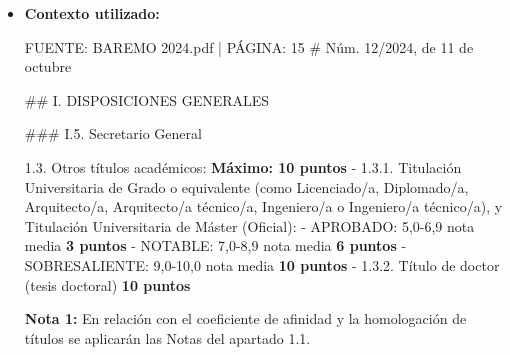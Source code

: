\documentclass{article}
\begin{document}
\begin{itemize}
\begin{itemize}
                - \textbf{1 punto / 10 horas} = \textbf{0,1 puntos por hora}.

                Sin embargo, es importante tener en cuenta que este cálculo se basa en la interpretación de la información proporcionada y podría requerir ajustes según la normativa específica o contextos adicionales no mencionados en el texto proporcionado.

                \#\#\# Complementos a la Puntuación

                Además, existen complementos que pueden multiplicar la puntuación obtenida por la experiencia docente, como:

                - \textbf{Complemento 1 (multiplicativo):} Docencia en Máster Universitario (oficial) puede multiplicar la puntuación por 1,50.
                - \textbf{Complemento 2 (multiplicando al complemento 1):} Docencia en inglés u otras lenguas diferentes a las que son objeto de estudio puede multiplicar la puntuación por 1,50.

                Estos complementos pueden aumentar significativamente la puntuación final por la experiencia docente, dependiendo de las características específicas de la docencia impartida.
          \item \textbf{Contexto utilizado:}
                \begin{scriptsize}
                  FUENTE: BAREMO 2024.pdf | PÁGINA: 15
                  \# Núm. 12/2024, de 11 de octubre

                  \#\# I. DISPOSICIONES GENERALES

                  \#\#\# I.5. Secretario General

                  1.3. Otros títulos académicos:                                                            \textbf{Máximo: 10 puntos}
                  - 1.3.1. Titulación Universitaria de Grado o equivalente (como Licenciado/a, Diplomado/a, Arquitecto/a, Arquitecto/a técnico/a, Ingeniero/a o Ingeniero/a técnico/a), y Titulación Universitaria de Máster (Oficial):
                  - APROBADO: 5,0-6,9 nota media                            \textbf{3 puntos}
                  - NOTABLE: 7,0-8,9 nota media                             \textbf{6 puntos}
                  - SOBRESALIENTE: 9,0-10,0 nota media                      \textbf{10 puntos}
                  - 1.3.2. Título de doctor (tesis doctoral)                  \textbf{10 puntos}

                  \textbf{Nota 1:} En relación con el coeficiente de afinidad y la homologación de títulos se aplicarán las Notas del apartado 1.1.


\end{scriptsize}
\end{itemize}
\end{itemize}
\end{document}
